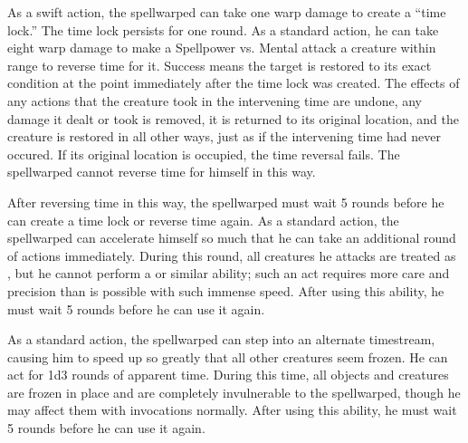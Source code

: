             As a swift action, the spellwarped can take one warp damage to create a ``time lock.'' The time lock persists for one round.
            As a standard action, he can take eight warp damage to make a Spellpower vs. Mental attack a creature within \rngmed range to reverse time for it.
            Success means the target is restored to its exact condition at the point immediately after the time lock was created.
            The effects of any actions that the creature took in the intervening time are undone, any damage it dealt or took is removed, it is returned to its original location, and the creature is restored in all other ways, just as if the intervening time had never occured.
            If its original location is occupied, the time reversal fails.
            The spellwarped cannot reverse time for himself in this way.
            \par After reversing time in this way, the spellwarped must wait 5 rounds before he can create a time lock or reverse time again.
            As a standard action, the spellwarped can accelerate himself so much that he can take an additional round of actions immediately.
            During this round, all creatures he attacks are treated as \helpless, but he cannot perform a  or similar ability; such an act requires more care and precision than is possible with such immense speed.
            After using this ability, he must wait 5 rounds before he can use it again.

            As a standard action, the spellwarped can step into an alternate timestream, causing him to speed up so greatly that all other creatures seem frozen.
            He can act for 1d3 rounds of apparent time.
            During this time, all objects and creatures are frozen in place and are completely invulnerable to the spellwarped, though he may affect them with invocations normally.
            After using this ability, he must wait 5 rounds before he can use it again.

